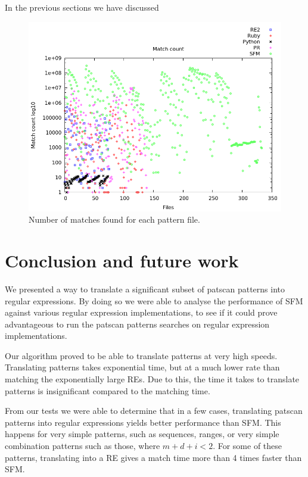 \documentclass[12pt]{article}
\theoremstyle{definition}
\begin{document}
In the previous sections we have discussed 

\begin{figure}[H]
	\begin{center}
		\includegraphics[scale=0.55]{graphs/match_count.png}	
	\end{center}
	\caption{Number of matches found for each pattern file.}
	\label{graph:match_time}
\end{figure}

\section{Conclusion and future work}

We presented a way to translate a significant subset of patscan patterns into regular expressions. By doing so we were able to analyse the performance of SFM against various regular expression implementations, to see if it could prove advantageous to run the patscan patterns searches on regular expression implementations.

Our algorithm proved to be able to translate patterns at very high speeds. Translating patterns takes exponential time, but at a much lower rate than matching the exponentially large REs. Due to this, the time it takes to translate patterns is insignificant compared to the matching time.

From our tests we were able to determine that in a few cases, translating patscan patterns into regular expressions yields better performance than SFM. This happens for very simple patterns, such as sequences, ranges, or very simple combination patterns such as those, where $m+d+i<2$. For some of these patterns, translating into a RE gives a match time more than 4 times faster than SFM.
\end{document}
